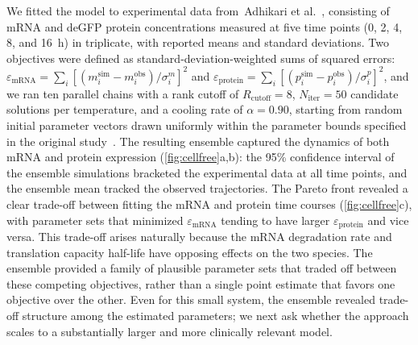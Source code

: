 \documentclass[12pt]{article}
\begin{document}
We fitted the model to experimental data from~Adhikari et al.~\cite{Adhikari2020}, consisting of mRNA and deGFP protein concentrations measured at five time points (0, 2, 4, 8, and 16~h) in triplicate, with reported means and standard deviations. Two objectives were defined as standard-deviation-weighted sums of squared errors: $\varepsilon_{\text{mRNA}} = \sum_i [(m_i^{\text{sim}} - m_i^{\text{obs}}) / \sigma_i^m]^2$ and $\varepsilon_{\text{protein}} = \sum_i [(p_i^{\text{sim}} - p_i^{\text{obs}}) / \sigma_i^p]^2$, and we ran ten parallel chains with a rank cutoff of $R_{\text{cutoff}} = 8$, $N_{\text{iter}} = 50$ candidate solutions per temperature, and a cooling rate of $\alpha = 0.90$, starting from random initial parameter vectors drawn uniformly within the parameter bounds specified in the original study~\cite{Adhikari2020}. The resulting ensemble captured the dynamics of both mRNA and protein expression (\cref{fig:cellfree}a,b): the 95\% confidence interval of the ensemble simulations bracketed the experimental data at all time points, and the ensemble mean tracked the observed trajectories. The Pareto front revealed a clear trade-off between fitting the mRNA and protein time courses (\cref{fig:cellfree}c), with parameter sets that minimized $\varepsilon_{\text{mRNA}}$ tending to have larger $\varepsilon_{\text{protein}}$ and vice versa. This trade-off arises naturally because the mRNA degradation rate and translation capacity half-life have opposing effects on the two species. The ensemble provided a family of plausible parameter sets that traded off between these competing objectives, rather than a single point estimate that favors one objective over the other. Even for this small system, the ensemble revealed trade-off structure among the estimated parameters; we next ask whether the approach scales to a substantially larger and more clinically relevant model.
\end{document}
